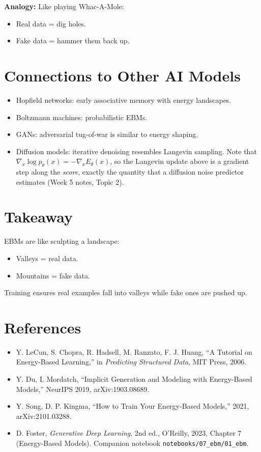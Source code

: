 \documentclass[11pt]{article}
\theoremstyle{remark}
\begin{document}
\textbf{Analogy:} Like playing Whac-A-Mole:
\begin{itemize}
  \item Real data = dig holes.
  \item Fake data = hammer them back up.
\end{itemize}

\section{Connections to Other AI Models}
\begin{itemize}
  \item Hopfield networks: early associative memory with energy landscapes.
  \item Boltzmann machines: probabilistic EBMs.
  \item GANs: adversarial tug-of-war is similar to energy shaping.
  \item Diffusion models: iterative denoising resembles Langevin sampling. Note that $\nabla_x \log p_\theta(x) = -\nabla_x E_\theta(x)$, so the Langevin update above is a gradient step along the \emph{score}, exactly the quantity that a diffusion noise predictor estimates (Week 5 notes, Topic 2).
\end{itemize}

\section{Takeaway}
EBMs are like sculpting a landscape:
\begin{itemize}
  \item Valleys = real data.
  \item Mountains = fake data.
\end{itemize}
Training ensures real examples fall into valleys while fake ones are pushed up.

\section*{References}
\begin{itemize}[leftmargin=1.5em]
\item Y. LeCun, S. Chopra, R. Hadsell, M. Ranzato, F. J. Huang, ``A Tutorial on Energy-Based Learning,'' in \emph{Predicting Structured Data}, MIT Press, 2006.
\item Y. Du, I. Mordatch, ``Implicit Generation and Modeling with Energy-Based Models,'' NeurIPS 2019, arXiv:1903.08689.
\item Y. Song, D. P. Kingma, ``How to Train Your Energy-Based Models,'' 2021, arXiv:2101.03288.
\item D. Foster, \emph{Generative Deep Learning}, 2nd ed., O'Reilly, 2023, Chapter 7 (Energy-Based Models). Companion notebook \texttt{notebooks/07\_ebm/01\_ebm}.
\end{itemize}
\end{document}
